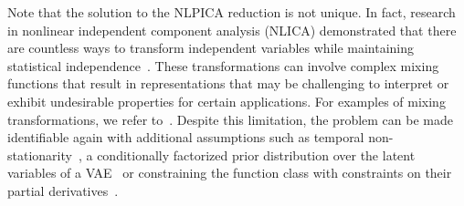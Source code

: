 Note that the solution to the NLPICA reduction is not unique. 
In fact, research in nonlinear independent component analysis (NLICA) demonstrated that there are countless ways to transform independent variables while maintaining statistical independence~\citep{darmois1951analyse_liaisons,jutten2004_BSS_NLICA}. These transformations can involve complex mixing functions that result in representations that may be challenging to interpret or exhibit undesirable properties for certain applications. 
For examples of mixing transformations, we refer to~\citep{taleb1999example_mixing}. 
Despite this limitation, the problem can be made identifiable again with additional assumptions such as temporal non-stationarity~\citep{hyvarinen2016time_contrast_ica}, a conditionally factorized prior distribution over the latent variables of a VAE~\citep{khemakhem2020ivae_ica} or constraining the function class with constraints on their partial derivatives~\citep{buchholz2022ident_nlica_fn_class}.
